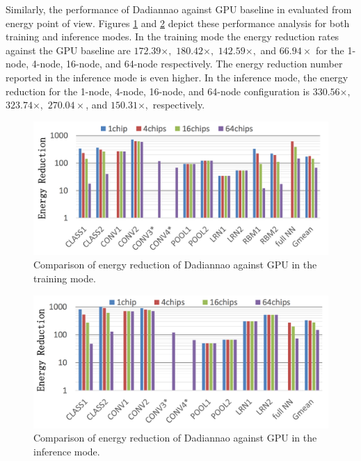 \documentclass[runningheads,a4paper]{llncs}
\begin{document}
Similarly, the performance of Dadiannao against GPU baseline in evaluated from energy point of view. Figures \ref{fig:dadiannao_training} and \ref{fig:dadiannao_inference} depict these performance analysis for both training and inference modes. In the training mode the energy reduction rates against the GPU baseline are $172.39\times,$ $180.42\times,$ $142.59\times,$ and $66.94\times$ for the 1-node, 4-node, 16-node, and 64-node respectively. The energy reduction number reported in the inference mode is even higher. In the inference mode, the energy reduction for the 1-node, 4-node, 16-node, and 64-node configuration is $330.56\times,$ $323.74\times,$ $270.04\times$, and $150.31\times,$ respectively.

\begin{figure}[!htb]
	\includegraphics[scale=0.45]{./images/dadiannao_training.png}
	\centering
	\caption{Comparison of energy reduction of Dadiannao against GPU in the training mode\cite{chen2014dadiannao}.}
	\label{fig:dadiannao_training}
\end{figure}
\begin{figure}[!htb]
	\includegraphics[scale=0.45]{./images/dadiannao_inference.png}
	\centering
	\caption{Comparison of energy reduction of Dadiannao against GPU in the inference mode\cite{chen2014dadiannao}.}
	\label{fig:dadiannao_inference}
\end{figure}
\end{document}
